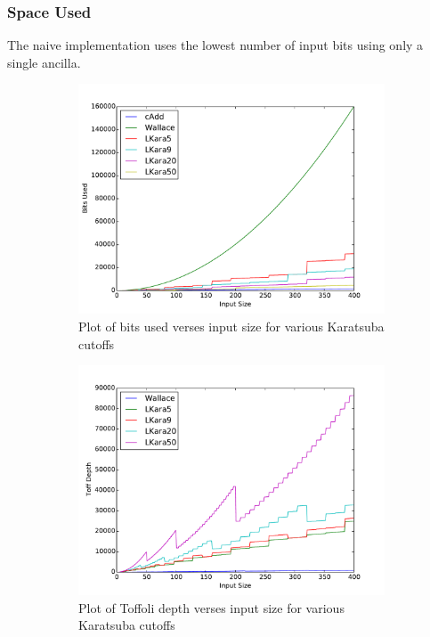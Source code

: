     \subsubsection{Space Used}
      The naive implementation uses the lowest number of input bits using only a single ancilla.
      \begin{figure}
      \centering
      \begin{subfigure}[b]{0.45\textwidth}
        \capstart
        \includegraphics[width=\textwidth]{images/LKaraSize} 
        \caption{Plot of bits used verses input size for various Karatsuba cutoffs}
        \label{fig:size}
      \end{subfigure}
      \hfill
      \begin{subfigure}[b]{0.45\textwidth}
        \capstart
        \includegraphics[width=\textwidth]{images/LKaraDepth2} 
        \caption{Plot of Toffoli depth verses input size for various Karatsuba cutoffs}
        \label{fig:depth}
      \end{subfigure}
      \caption{}
      \end{figure}

